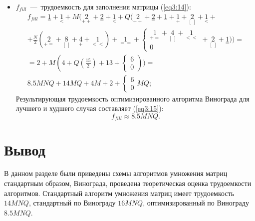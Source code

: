 \begin{itemize}
	\item $f_{fill}$~---~трудоемкость для заполнения матрицы (\ref{eq3:14}):
	\begin{multline}
		f_{fill} = {\underset{=}{1}} + {\underset{<}{1}} + M({\underset{++}{2}} + {\underset{=}{2}} + {\underset{<}{1}} + Q({\underset{++}{2}} + {\underset{=}{2}} + {\underset{-}{1}} + {\underset{+}{1}} + {\underset{[\ ]}{2}} + {\underset{<}{1}} + \\
		+ \frac{N}{2}({\underset{+=}{2}} + {\underset{[\ ]}{8}} + {\underset{+}{4}} + {\underset{<<}{1}}) + {\underset{==}{1}} 
		+  \begin{cases}
			{\underset{+=}{1}} + {\underset{[ \ ]}{4}} + {\underset{<<}{1}}\\
			0
		\end{cases} + {\underset{[\ ]}{2}} + {\underset{=}{1}})) = \\
		= 2 + M(4 + Q(\frac{15}{2}) + 13 + \begin{cases}
			6\\
			0
		\end{cases})) = \\
		8.5MNQ + 14MQ + 4M + 2 + \begin{cases}
			6\\
			0
		\end{cases} MQ;
		\label{eq3:14}
	\end{multline}
	Результирующая трудоемкость оптимизированного алгоритма Винограда для лучшего и худшего случая составляет (\ref{eq3:15}):
	\begin{equation}
		f_{fill} \approx 8.5MNQ.
		\label{eq3:15}
	\end{equation}
	
\end{itemize}

\section*{Вывод}
В данном разделе были приведены схемы алгоритмов умножения матриц стандартным образом, Винограда, проведена теоретическая оценка трудоемкости алгоритмов. Стандартный алгоритм умножения матриц имеет трудоемкость $14MNQ$, стандартный по Винограду $16MNQ$, оптимизированный по Винограду $8.5MNQ$.
